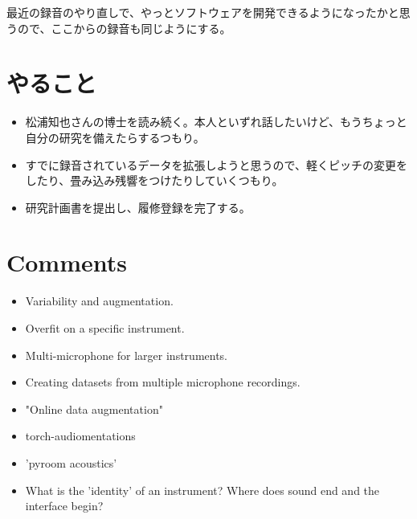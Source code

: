 \documentclass[a4paper, 12pt]{article}
\begin{document}
最近の録音のやり直しで、やっとソフトウェアを開発できるようになったかと思うので、ここからの録音も同じようにする。

\section*{やること}
\begin{itemize}
    \item 松浦知也さんの博士を読み続く。本人といずれ話したいけど、もうちょっと自分の研究を備えたらするつもり。
    \item すでに録音されているデータを拡張しようと思うので、軽くピッチの変更をしたり、畳み込み残響をつけたりしていくつもり。
    \item 研究計画書を提出し、履修登録を完了する。
\end{itemize}

\section{Comments}

\begin{itemize}
    \item Variability and augmentation.
    \item Overfit on a specific instrument.
    \item Multi-microphone for larger instruments.
    \item Creating datasets from multiple microphone recordings.
    \item "Online data augmentation"
    \item torch-audiomentations
    \item 'pyroom acoustics'
    \item What is the 'identity' of an instrument? Where does sound end and the interface begin?
\end{itemize}



\end{document}

